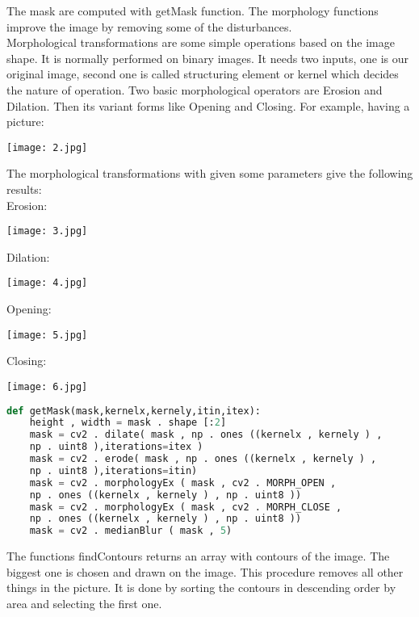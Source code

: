 \documentclass[12pt]{article}
\begin{document}
\vspace{5mm}
The mask are computed with getMask function. The morphology functions improve the image by removing some of the disturbances.\\
\newpage
Morphological transformations are some simple operations based on the image shape. It is normally performed on binary images. It needs two inputs, one is our original image, second one is called structuring element or kernel which decides the nature of operation. Two basic morphological operators are Erosion and Dilation. Then its variant forms like Opening and Closing. For example, having a picture:\\
\begin{center}
\texttt{[image: 2.jpg]}
\end{center}
The morphological transformations with given some parameters give the following results:\\
Erosion:\\
\begin{center}
	\texttt{[image: 3.jpg]}
\end{center}
Dilation:\\
\begin{center}
	\texttt{[image: 4.jpg]}
\end{center}
\newpage
Opening:\\
\begin{center}
	\texttt{[image: 5.jpg]}
\end{center}
Closing:\\
\begin{center}
	\texttt{[image: 6.jpg]}
\end{center}
\vspace{5mm}
\begin{lstlisting}[language=Python]
def getMask(mask,kernelx,kernely,itin,itex):
	height , width = mask . shape [:2]
	mask = cv2 . dilate( mask , np . ones ((kernelx , kernely ) ,
	np . uint8 ),iterations=itex )
	mask = cv2 . erode( mask , np . ones ((kernelx , kernely ) ,
	np . uint8 ),iterations=itin)           
	mask = cv2 . morphologyEx ( mask , cv2 . MORPH_OPEN ,
	np . ones ((kernelx , kernely ) , np . uint8 ))
	mask = cv2 . morphologyEx ( mask , cv2 . MORPH_CLOSE ,
	np . ones ((kernelx , kernely ) , np . uint8 ))
	mask = cv2 . medianBlur ( mask , 5)
\end{lstlisting}
\vspace{5mm}
\newpage
The functions findContours returns an array with contours of the image. The biggest one is chosen and drawn on the image. This procedure removes all other things in the picture. It is done by sorting the contours in descending order by area and selecting the first one.
\end{document}
